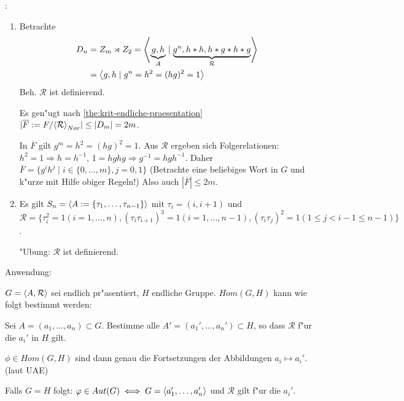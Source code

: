 \example:{
  \begin{enumerate}
    \item Betrachte
      \begin{align*}
        D_n&=Z_m\rtimes Z_2
	={\left\langle\underbrace{g,h}_A\mid\underbrace{g^n,h*h,h*g*h*g}_{\mathcal R}\right\rangle}\\
	&={\left\langle g,h\mid g^n=h^2=(hg)^2=1\right\rangle}
	\end{align*}
      Beh. $\mathcal R$ ist definierend.
      
      Es gen"ugt nach \ref{the:krit-endliche-praesentation} 
      $|\overline F:=F/ {\left\langle\mathcal R\right\rangle}_{Nor}|\leq |D_m|=2m$.
      
      In $\overline F$ gilt $g^m=h^2=(hg)^2=1$.
      Aus $\mathcal R$ ergeben sich Folgerelationen: 
      $h^2=1\Rightarrow h=h^{-1}$, $1=hghg\Rightarrow g^{-1}=hgh^{-1}$.
      Daher $\overline F=\{g^ih^j\mid i\in\{0,\ldots,m\}, j=0,1\}$
      (Betrachte eine beliebiges Wort in $G$ und k"urze mit Hilfe obiger
      Regeln!)
      Also auch $|\overline F|\leq 2m$.
    \item Es gilt $S_n={\left\langle A:=\{\tau_1,\ldots,\tau_{n-1}\}\right\rangle}$ mit $\tau_i=(i,i+1)$ und
      $\mathcal R=\{\tau_i^2=1 (i=1,\ldots,n),(\tau_i\tau_{i+1})^3=1 (i=1,\ldots,n-1), (\tau_i\tau_j)^2=1 (1\leq j<i-1\leq n-1)\}$.
      
      "Ubung: $\mathcal R$ ist definierend.
    \end{enumerate}
  }
\remark Anwendung:{
  $G={\left\langle A,\mathcal R\right\rangle}$ sei endlich pr"asentiert, $H$ endliche Gruppe.
  $Hom(G,H)$ kann wie folgt bestimmt werden:
  
  Sei $A=(a_1,\ldots,a_n)\subset G$. Bestimme alle $A'=(a_1',\ldots,a_n')\subset H$, so dass
  $\mathcal R$ f"ur die $a_i'$ in $H$ gilt.
  
  $\phi\in Hom(G,H)$ sind dann genau die Fortsetzungen der Abbildungen $a_i\mapsto a_i'$.
  (laut UAE)
  
  Falls $G=H$ folgt: $\varphi\in Aut(G)\iff G={\left\langle a_1',\ldots,a_n'\right\rangle}$ und 
  $\mathcal R$ gilt f"ur die $a_i'$.
  }
